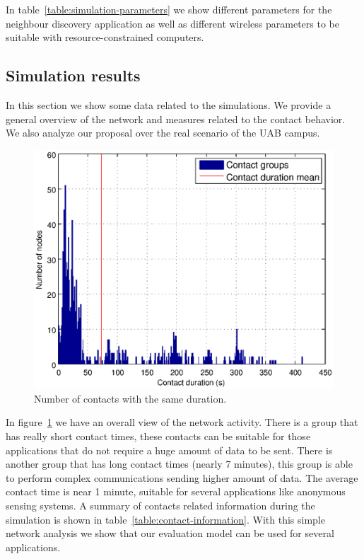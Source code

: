 In table~\ref{table:simulation-parameters} we show different parameters for the neighbour discovery application as well as different wireless parameters to be suitable with resource-constrained computers.

\subsection{Simulation results}

In this section we show some data related to the simulations. We provide a
general overview of the network and measures related to the contact behavior.
We also analyze our proposal over the real scenario of the UAB campus.

\begin{figure}[h!bt]
  \centering
  \includegraphics[scale=0.70]{imgs/statistics/contacts-duration}
  \caption{Number of contacts with the same duration.}
  \label{fig:contact-duration-group}
\end{figure}

In figure~\ref{fig:contact-duration-group} we have an overall view of the
network activity. 
There is a group that has really short contact times, these contacts can be suitable for those applications that do not require a huge amount of data to be sent. There is another group that has long contact times (nearly 7 minutes), this group is able to perform complex communications sending higher amount of data. The average contact time is near 1 minute, suitable for several applications like anonymous sensing systems. A summary of contacts related information during the simulation is shown in table~\ref{table:contact-information}. With this simple network analysis we show that our evaluation model can be used for several applications. 


